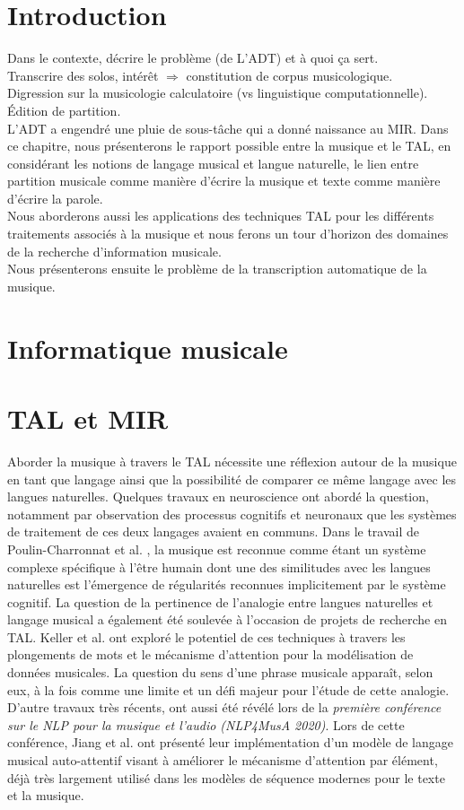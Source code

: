 \section*{Introduction}
Dans le contexte, décrire le problème (de L’ADT) et à quoi ça sert.\\
Transcrire des solos, intérêt $\Rightarrow$ constitution de corpus musicologique.\\
Digression sur la musicologie calculatoire (vs linguistique computationnelle).\\
Édition de partition.\\
L’ADT a engendré une pluie de sous-tâche qui a donné naissance au MIR. 
Dans ce chapitre, nous présenterons le rapport possible entre la musique et le TAL, en considérant les notions de langage musical et langue naturelle, le lien entre partition musicale comme manière d’écrire la musique et texte comme manière d’écrire la parole.\\
Nous aborderons aussi les applications des techniques TAL pour les différents traitements associés à la musique et nous ferons un tour d’horizon des domaines de la recherche d’information musicale.\\ Nous présenterons ensuite le problème de la transcription automatique de la musique.

\section{Informatique musicale}
\cite{first_one}
\section{TAL et MIR}
Aborder la musique à travers le TAL nécessite une réflexion autour de la musique en tant que langage ainsi que la possibilité de comparer ce même langage avec les langues naturelles. Quelques travaux en neuroscience ont abordé la question, notamment par observation des processus cognitifs et neuronaux que les systèmes de traitement de ces deux langages avaient en communs. Dans le travail de Poulin-Charronnat et al. \cite{poulincharronnat:hal-01985213}, la musique est reconnue comme étant un système complexe spécifique à l’être humain dont une des similitudes avec les langues naturelles est l’émergence de régularités reconnues implicitement par le système cognitif. La question de la pertinence de l’analogie entre langues naturelles et langage musical a également été soulevée à l’occasion de projets de recherche en TAL. Keller et al. \cite{keller:hal-03279850} ont exploré le potentiel de ces techniques à travers les plongements de mots et le mécanisme d’attention pour la modélisation de données musicales. La question du sens d’une phrase musicale apparaît, selon eux, à la fois comme une limite et un défi majeur pour l’étude de cette analogie.\\
D’autre travaux très récents, ont aussi été révélé lors de la \textit{première conférence sur le NLP pour la musique et l'audio (NLP4MusA 2020)}. Lors de cette conférence, Jiang et al. \cite{Jiang2020DiscoveringMR} ont présenté leur implémentation d’un modèle de langage musical auto-attentif visant à améliorer le mécanisme d'attention par élément, déjà très largement utilisé dans les modèles de séquence modernes pour le texte et la musique.
